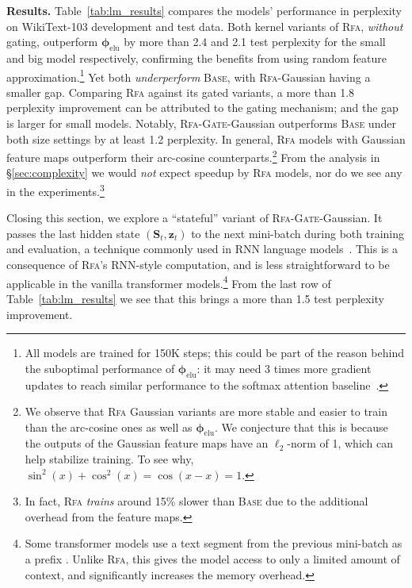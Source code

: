 \textbf{Results.}
Table~\ref{tab:lm_results} compares the models' performance in perplexity on WikiText-103 development and test data. Both kernel variants of \textsc{Rfa}, \emph{without} gating, outperform $\boldsymbol{\phi}_{\operatorname{elu}}$
by more than 2.4 and 2.1 test perplexity for the small and big model respectively, confirming the benefits from using random feature approximation.\footnote{
    All models are trained for 150K steps; this could be part of the reason behind the suboptimal performance of $\boldsymbol{\phi}_{\operatorname{elu}}$: 
    it may need 3 times more gradient updates to reach similar performance to the softmax attention baseline~\citep{katharopoulos20transformers}. } Yet both \emph{underperform} \textsc{Base}, with
\textsc{Rfa}-Gaussian having a smaller gap. Comparing \textsc{Rfa} against its gated variants, a more than 1.8 perplexity improvement can be attributed to the gating mechanism; and the gap is larger for small models. Notably, \textsc{Rfa-Gate}-Gaussian outperforms \textsc{Base}
under both size settings by at least 1.2 perplexity. In general, \textsc{Rfa} models with Gaussian feature maps outperform their arc-cosine counterparts.\footnote{
    We observe that \textsc{Rfa} Gaussian variants are more stable and easier to train than the arc-cosine ones as well as $\boldsymbol{\phi}_{\operatorname{elu}}$.
    We conjecture that this is because the outputs of the Gaussian feature maps have an $\ell_2$-norm of 1, which can help stabilize training. To see why, $\sin^2(x) + \cos^2(x)=\cos(x-x)=1$.
}
From the analysis in \S\ref{sec:complexity} we would \emph{not} expect speedup by \textsc{Rfa} models, nor do we see any in the experiments.\footnote{
In fact, \textsc{Rfa} \emph{trains} around 15\% slower than \textsc{Base} due to the additional overhead from the feature maps. }

Closing this section, we explore a ``stateful'' variant of  \textsc{Rfa-Gate}-Gaussian. 
It passes the last hidden state $({\mathbf{S}}_t, {\mathbf{z}}_t)$
to the next mini-batch during both training and evaluation, a technique commonly used in RNN language models~\citep{merity2018reg}. This is a consequence of \textsc{Rfa}'s RNN-style computation, and is less straightforward to be applicable in the vanilla transformer models.\footnote{Some transformer models use a text segment from the previous mini-batch as a prefix \citep{baevski2018adaptive,dai2019}. Unlike \textsc{Rfa}, this gives the model access to only a limited amount of context, and significantly increases the memory overhead. } From the last row of Table~\ref{tab:lm_results} 
we see that this brings a more than 1.5 test perplexity improvement. 

